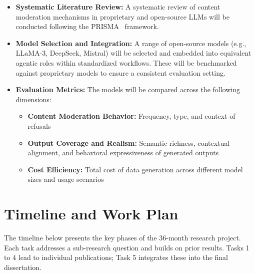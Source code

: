 \documentclass[12pt,a4paper]{article}
\begin{document}
\begin{itemize}
    \item \textbf{Systematic Literature Review:}  
    A systematic review of content moderation mechanisms in proprietary and open-source LLMs will be conducted following the PRISMA~\cite{PRISMA} framework.

    \item \textbf{Model Selection and Integration:}  
    A range of open-source models (e.g., LLaMA-3, DeepSeek, Mistral) will be selected and embedded into equivalent agentic roles within standardized workflows. These will be benchmarked against proprietary models to ensure a consistent evaluation setting.

    \item \textbf{Evaluation Metrics:}  
    The models will be compared across the following dimensions:
    \begin{itemize}
        \item \textbf{Content Moderation Behavior:} Frequency, type, and context of refusals
        \item \textbf{Output Coverage and Realism:} Semantic richness, contextual alignment, and behavioral expressiveness of generated outputs
        \item \textbf{Cost Efficiency:} Total cost of data generation across different model sizes and usage scenarios
    \end{itemize}
\end{itemize}











\newpage

\section{Timeline and Work Plan}


The timeline below presents the key phases of the 36-month research project. Each task addresses a sub-research question and builds on prior results. Tasks 1 to 4 lead to individual publications; Task 5 integrates these into the final dissertation.
\end{document}
